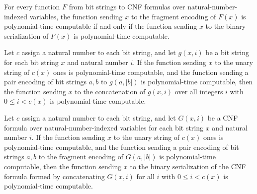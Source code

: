 \begin{theorem}
\label{Complexity.FormulaKit.polyTimeComputable_fragment_iff_serialize}
\leanok
{}
For every function $F$ from bit strings to CNF formulas over natural-number-indexed
variables, the function sending $x$ to the fragment encoding of $F(x)$ is
polynomial-time computable if and only if the function sending $x$ to the binary
serialization of $F(x)$ is polynomial-time computable.
\end{theorem}

\begin{theorem}
\label{Complexity.FormulaKit.polyTimeComputable_flatMap_range}
\leanok
{}
Let $c$ assign a natural number to each bit string, and let $g(x,i)$ be a bit string for
each bit string $x$ and natural number $i$. If the function sending $x$ to the unary
string of $c(x)$ ones is polynomial-time computable, and the function sending a pair
encoding of bit strings $a,b$ to $g(a,|b|)$ is polynomial-time computable, then the
function sending $x$ to the concatenation of $g(x,i)$ over all integers $i$ with $0 \le
i < c(x)$ is polynomial-time computable.
\end{theorem}

\begin{theorem}
\label{Complexity.FormulaKit.polyTimeComputable_serialize_flatMap}
\leanok
{}
Let $c$ assign a natural number to each bit string, and let $G(x,i)$ be a CNF formula
over natural-number-indexed variables for each bit string $x$ and natural number $i$. If
the function sending $x$ to the unary string of $c(x)$ ones is polynomial-time
computable, and the function sending a pair encoding of bit strings $a,b$ to the
fragment encoding of $G(a,|b|)$ is polynomial-time computable, then the function sending
$x$ to the binary serialization of the CNF formula formed by concatenating $G(x,i)$ for
all $i$ with $0\le i<c(x)$ is polynomial-time computable.
\end{theorem}

